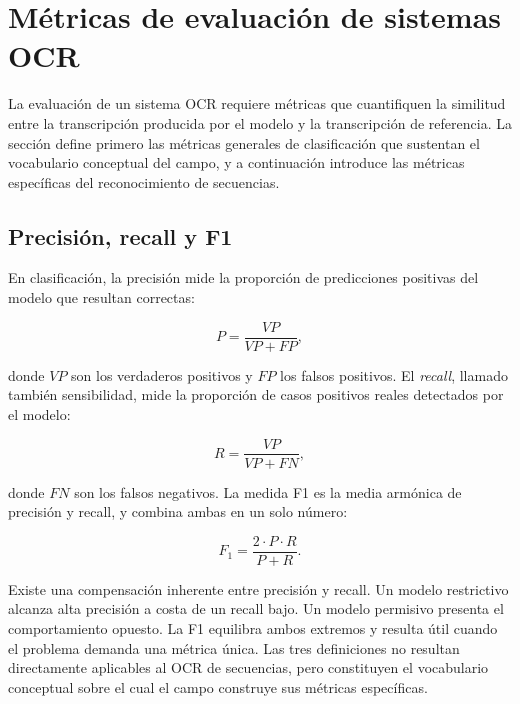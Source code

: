 \section{Métricas de evaluación de sistemas OCR}
\label{sec:metricas}

La evaluación de un sistema OCR requiere métricas que cuantifiquen la similitud entre la transcripción producida por el modelo y la transcripción de referencia. La sección define primero las métricas generales de clasificación que sustentan el vocabulario conceptual del campo, y a continuación introduce las métricas específicas del reconocimiento de secuencias.

\subsection{Precisión, recall y F1}

En clasificación, la precisión mide la proporción de predicciones positivas del modelo que resultan correctas:

\begin{equation}
	P = \frac{VP}{VP + FP},
	\label{eq:precision}
\end{equation}

donde $VP$ son los verdaderos positivos y $FP$ los falsos positivos. El \textit{recall}, llamado también sensibilidad, mide la proporción de casos positivos reales detectados por el modelo:

\begin{equation}
	R = \frac{VP}{VP + FN},
	\label{eq:recall}
\end{equation}

donde $FN$ son los falsos negativos. La medida F1 es la media armónica de precisión y recall, y combina ambas en un solo número:

\begin{equation}
	F_1 = \frac{2 \cdot P \cdot R}{P + R}.
	\label{eq:f1}
\end{equation}

Existe una compensación inherente entre precisión y recall. Un modelo restrictivo alcanza alta precisión a costa de un recall bajo. Un modelo permisivo presenta el comportamiento opuesto. La F1 equilibra ambos extremos y resulta útil cuando el problema demanda una métrica única. Las tres definiciones no resultan directamente aplicables al OCR de secuencias, pero constituyen el vocabulario conceptual sobre el cual el campo construye sus métricas específicas.

